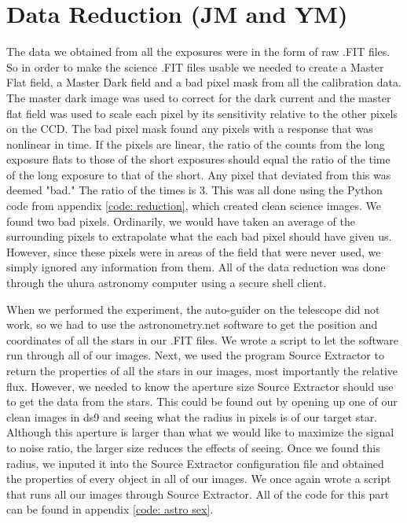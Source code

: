 \documentclass{aastex61}
\begin{document}
\section{Data Reduction (JM and YM)}
The data we obtained from all the exposures were in the form of raw .FIT files. So in order to make the science .FIT files usable we needed to create a Master Flat field, a Master Dark field and a bad pixel mask from all the calibration data. The master dark image was used to correct for the dark current and the master flat field was used to scale each pixel by its sensitivity relative to the other pixels on the CCD. The bad pixel mask found any pixels with a response that was nonlinear in time. If the pixels are linear, the ratio of the counts from the long exposure flats to those of the short exposures should equal the ratio of the time of the long exposure to that of the short. Any pixel that deviated from this was deemed "bad." The ratio of the times is 3. This was all done using the Python code from appendix \ref{code: reduction}, which created clean science images. We found two bad pixels. Ordinarily, we would have taken an average of the surrounding pixels to extrapolate what the each bad pixel should have given us. However, since these pixels were in areas of the field that were never used, we simply ignored any information from them. All of the data reduction was done through the uhura astronomy computer using a secure shell client. 

When we performed the experiment, the auto-guider on the telescope did not work, so we had to use the astronometry.net software to get the position and coordinates of all the stars in our .FIT files. We wrote a script to let the software run through all of our images. Next, we used the program Source Extractor to return the properties of all the stars in our images, most importantly the relative flux. However, we needed to know the aperture size Source Extractor should use to get the data from the stars. This could be found out by opening up one of our clean images in ds9 and seeing what the radius in pixels is of our target star. Although this aperture is larger than what we would like to maximize the signal to noise ratio, the larger size reduces the effects of seeing. Once we found this radius, we inputed it into the Source Extractor configuration file and obtained the properties of every object in all of our images. We once again wrote a script that runs all our images through Source Extractor. All of the code for this part can be found in appendix \ref{code: astro sex}.
\end{document}
